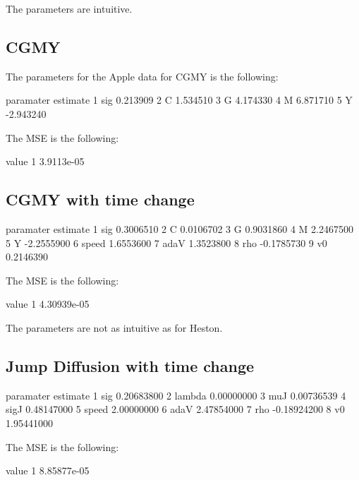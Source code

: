 \documentclass{article}
\begin{document}
The parameters are intuitive.

\subsection{CGMY}

The parameters for the Apple data for CGMY is the following:

\begin{Schunk}
\begin{Soutput}
  paramater  estimate
1       sig  0.213909
2         C  1.534510
3         G  4.174330
4         M  6.871710
5         Y -2.943240
\end{Soutput}
\end{Schunk}

The MSE is the following:

\begin{Schunk}
\begin{Soutput}
       value
1 3.9113e-05
\end{Soutput}
\end{Schunk}

\subsection{CGMY with time change}

\begin{Schunk}
\begin{Soutput}
  paramater   estimate
1       sig  0.3006510
2         C  0.0106702
3         G  0.9031860
4         M  2.2467500
5         Y -2.2555900
6     speed  1.6553600
7      adaV  1.3523800
8       rho -0.1785730
9        v0  0.2146390
\end{Soutput}
\end{Schunk}
The MSE is the following:

\begin{Schunk}
\begin{Soutput}
        value
1 4.30939e-05
\end{Soutput}
\end{Schunk}

The parameters are not as intuitive as for Heston.

\subsection{Jump Diffusion with time change}
\begin{Schunk}
\begin{Soutput}
  paramater    estimate
1       sig  0.20683800
2    lambda  0.00000000
3       muJ  0.00736539
4      sigJ  0.48147000
5     speed  2.00000000
6      adaV  2.47854000
7       rho -0.18924200
8        v0  1.95441000
\end{Soutput}
\end{Schunk}
The MSE is the following:

\begin{Schunk}
\begin{Soutput}
        value
1 8.85877e-05
\end{Soutput}
\end{Schunk}
\end{document}

